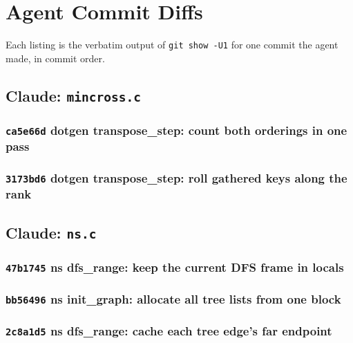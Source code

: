\section{Agent Commit Diffs}
\label{app:diffs}

Each listing is the verbatim output of \texttt{git show -U1} for one commit the
agent made, in commit order.


\subsection{Claude: \texttt{mincross.c}}

\subsubsection*{\texttt{ca5e66d} dotgen transpose\_step: count both orderings in one pass}


\subsubsection*{\texttt{3173bd6} dotgen transpose\_step: roll gathered keys along the rank}


\subsection{Claude: \texttt{ns.c}}

\subsubsection*{\texttt{47b1745} ns dfs\_range: keep the current DFS frame in locals}


\subsubsection*{\texttt{bb56496} ns init\_graph: allocate all tree lists from one block}


\subsubsection*{\texttt{2c8a1d5} ns dfs\_range: cache each tree edge's far endpoint}


